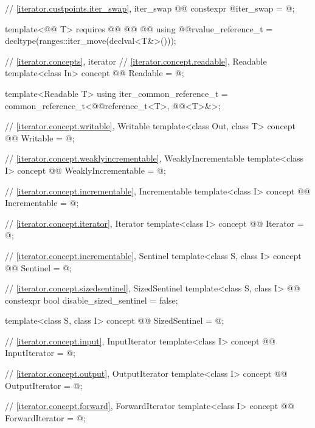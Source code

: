 \begin{addedblock}
\begin{codeblock}
{{      // \ref{iterator.custpoints.iter_swap}, iter_swap
      @@ constexpr @\unspec@ iter_swap = @\unspecnc@;
    }
  }

  template<@@ T>
      requires @\oldtxt{\seebelow}@
        @@
      @\newtxt{\}}@
    using @@rvalue_reference_t = decltype(ranges::iter_move(declval<T&>()));

  // \ref{iterator.concepts}, iterator 
  // \ref{iterator.concept.readable}, Readable
  template<class In>
  concept @@ Readable = @\seebelownc@;

  template<Readable T>
    using iter_common_reference_t =
      common_reference_t<@@reference_t<T>, @@<T>&>;

  // \ref{iterator.concept.writable}, Writable
  template<class Out, class T>
  concept @@ Writable = @\seebelownc@;

  // \ref{iterator.concept.weaklyincrementable}, WeaklyIncrementable
  template<class I>
  concept @@ WeaklyIncrementable = @\seebelownc@;

  // \ref{iterator.concept.incrementable}, Incrementable
  template<class I>
  concept @@ Incrementable = @\seebelownc@;

  // \ref{iterator.concept.iterator}, Iterator
  template<class I>
  concept @@ Iterator = @\seebelownc@;

  // \ref{iterator.concept.incrementable}, Sentinel
  template<class S, class I>
  concept @@ Sentinel = @\seebelownc@;

  // \ref{iterator.concept.sizedsentinel}, SizedSentinel
  template<class S, class I>
  @@ constexpr bool disable_sized_sentinel = false;

  template<class S, class I>
  concept @@ SizedSentinel = @\seebelownc@;

  // \ref{iterator.concept.input}, InputIterator
  template<class I>
  concept @@ InputIterator = @\seebelownc@;

  // \ref{iterator.concept.output}, OutputIterator
  template<class I>
  concept @@ OutputIterator = @\seebelownc@;

  // \ref{iterator.concept.forward}, ForwardIterator
  template<class I>
  concept @@ ForwardIterator = @\seebelownc@;


\end{codeblock}
\end{addedblock}
